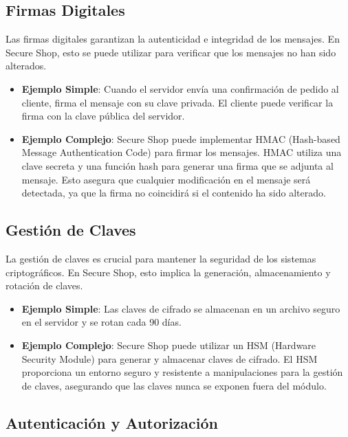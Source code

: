 \subsection{Firmas Digitales}

Las firmas digitales garantizan la autenticidad e integridad de los mensajes. En Secure Shop, esto se puede utilizar para verificar que los mensajes no han sido alterados.

\begin{itemize}
    \item \textbf{Ejemplo Simple}: Cuando el servidor envía una confirmación de pedido al cliente, firma el mensaje con su clave privada. El cliente puede verificar la firma con la clave pública del servidor.
    \item \textbf{Ejemplo Complejo}: Secure Shop puede implementar HMAC (Hash-based Message Authentication Code) para firmar los mensajes. HMAC utiliza una clave secreta y una función hash para generar una firma que se adjunta al mensaje. Esto asegura que cualquier modificación en el mensaje será detectada, ya que la firma no coincidirá si el contenido ha sido alterado.
\end{itemize}

\subsection{Gestión de Claves}

La gestión de claves es crucial para mantener la seguridad de los sistemas criptográficos. En Secure Shop, esto implica la generación, almacenamiento y rotación de claves.

\begin{itemize}
    \item \textbf{Ejemplo Simple}: Las claves de cifrado se almacenan en un archivo seguro en el servidor y se rotan cada 90 días.
    \item \textbf{Ejemplo Complejo}: Secure Shop puede utilizar un HSM (Hardware Security Module) para generar y almacenar claves de cifrado. El HSM proporciona un entorno seguro y resistente a manipulaciones para la gestión de claves, asegurando que las claves nunca se exponen fuera del módulo.
\end{itemize}

\subsection{Autenticación y Autorización}

